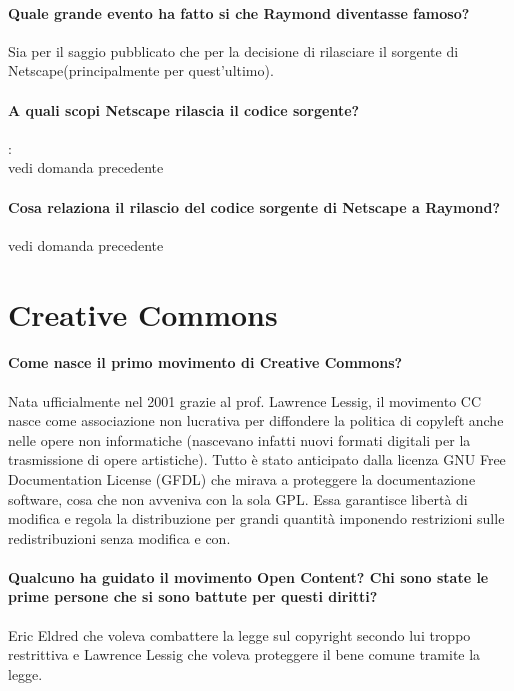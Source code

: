 \documentclass[a4paper]{article}
\begin{document}
		\paragraph{Quale grande evento ha fatto si che Raymond diventasse famoso?\\}
		Sia per il saggio pubblicato che per la decisione di rilasciare il sorgente di Netscape(principalmente per quest'ultimo).
		
		\paragraph{A quali scopi Netscape rilascia il codice sorgente?}
		: \\ vedi domanda precedente
		\paragraph{Cosa relaziona il rilascio del codice sorgente di Netscape a Raymond?}
		 vedi domanda precedente
		
	\section{Creative Commons}
	
		\paragraph{Come nasce il primo movimento di Creative Commons?}
			Nata ufficialmente nel 2001 grazie al prof. Lawrence Lessig, il movimento CC nasce come associazione non lucrativa per diffondere la politica di copyleft anche nelle opere non informatiche (nascevano infatti nuovi formati digitali per la trasmissione di opere artistiche). 
			Tutto è stato anticipato dalla licenza GNU Free Documentation License (GFDL) che mirava a proteggere la documentazione software, cosa che non avveniva con la sola GPL. Essa garantisce libertà di modifica e regola la distribuzione per grandi quantità imponendo restrizioni sulle redistribuzioni senza modifica e con.
		
		\paragraph{Qualcuno ha guidato il movimento Open Content? Chi sono state le prime persone che si sono battute per questi diritti?}
		Eric Eldred che voleva combattere la legge sul copyright secondo lui troppo restrittiva e Lawrence Lessig che voleva proteggere il bene comune tramite la legge.
		
\end{document}
